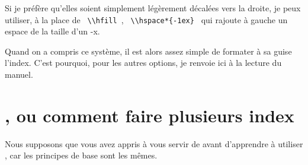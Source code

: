 Si je préfère qu'elles soient simplement légèrement décalées vers la droite, je peux utiliser, à la place de \verb| \\hfill |, \verb| \\hspace*{-1ex} |  qui rajoute à gauche un espace de la taille d'un -x. 


Quand on a compris ce système, il est alors assez simple de formater à sa guise l'index. C'est pourquoi, pour les autres options, je renvoie ici à la lecture du manuel.




\section{, ou comment faire plusieurs index}

\begin{prealable}
Nous supposons que vous avez appris à vous servir de  avant d'apprendre à utiliser , car les principes de base sont les mêmes.
\end{prealable}

